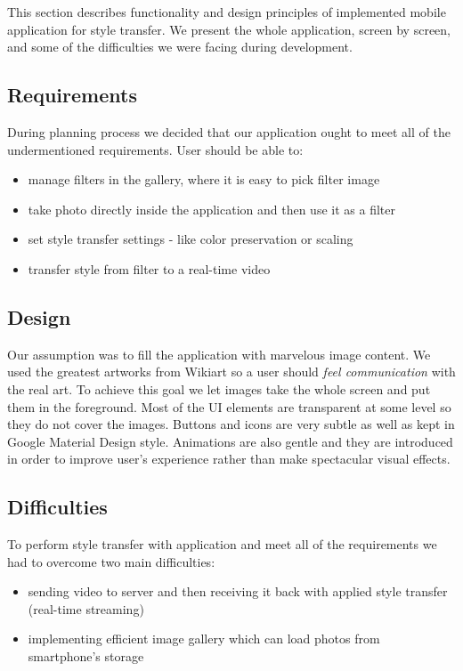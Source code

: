 \documentclass[../Main.tex]{subfiles}
\begin{document}
This section describes functionality and design principles of implemented mobile application for style transfer. We present the whole application, screen by screen, and some of the difficulties we were facing during development.

\subsection{Requirements}
During planning process we decided that our application ought to meet all of the 
undermentioned requirements.
User should be able to:
\begin{itemize}
    \item manage filters in the gallery, where it is easy to pick filter image
    \item take photo directly inside the application and then use it as a filter
    \item set style transfer settings - like color preservation or scaling
    \item transfer style from filter to a real-time video
\end{itemize}

\subsection{Design}
Our assumption was to fill the application with marvelous image content.
We used the greatest artworks from Wikiart \cite{wikiart} so a user should \textit{feel communication} with the real art.
To achieve this goal we let images take the whole screen and put them in the foreground.
Most of the UI elements are transparent at some level so they do not cover the images.
Buttons and icons are very subtle as well as kept in Google Material Design style.
Animations are also gentle and they are introduced in order to improve user's experience rather than make spectacular visual effects.


\subsection{Difficulties}
To perform style transfer with application and meet all of the requirements
we had to overcome two main difficulties:
\begin{itemize}
    \item sending video to server and then receiving it back with applied style transfer (real-time streaming)
    \item implementing efficient image gallery which can load photos from smartphone's storage
\end{itemize}
\end{document}
